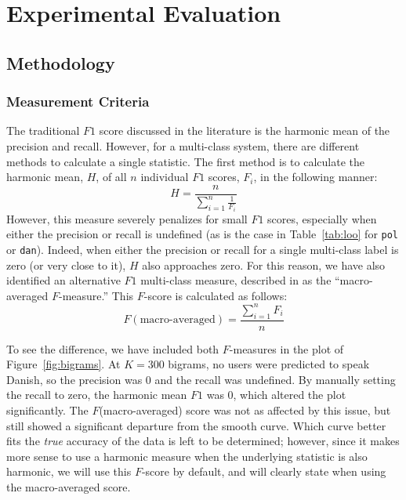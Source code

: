 \documentclass[11pt]{article}
\begin{document}
 
\section{Experimental Evaluation}

\subsection{Methodology}

\subsubsection{Measurement Criteria}
The traditional $F1$ score discussed in the literature is the harmonic mean of the precision and recall.  However, for a multi-class system, there are different methods to calculate a single statistic.  The first method is to calculate the harmonic mean, $H$, of all $n$ individual $F1$ scores, $F_i$, in the following manner:
\begin{equation}\label{eq:harm-f1}
H = \frac{n}{\sum_{i=1}^n{\frac{1}{F_i}}}
\end{equation}
However, this measure severely penalizes for small $F1$ scores, especially when either the precision or recall is undefined (as is the case in Table~\ref{tab:loo} for {\tt pol} or {\tt dan}).  Indeed, when either the precision or recall for a single multi-class label is zero (or very close to it), $H$ also approaches zero.  For this reason, we have also identified an alternative $F1$ multi-class measure, described in \cite{f1-multiclass} as the ``macro-averaged $F$-measure.'' This $F$-score is calculated as follows:
\begin{equation}\label{eq:mac-f1}
F(\mbox{macro-averaged})=\frac{\sum_{i=1}^n{F_i}}{n}
\end{equation}

To see the difference, we have included both $F$-measures in the plot of Figure~\ref{fig:bigrams}.  At $K=300$ bigrams, no users were predicted to speak Danish, so the precision was 0 and the recall was undefined.  By manually setting the recall to zero, the harmonic mean $F1$ was 0, which altered the plot significantly.  The $F$(macro-averaged) score was not as affected by this issue, but still showed a significant departure from the smooth curve.  Which curve better fits the {\it true} accuracy of the data is left to be determined; however, since it makes more sense to use a harmonic measure when the underlying statistic is also harmonic, we will use this $F$-score by default, and will clearly state when using the macro-averaged score.
\end{document}
